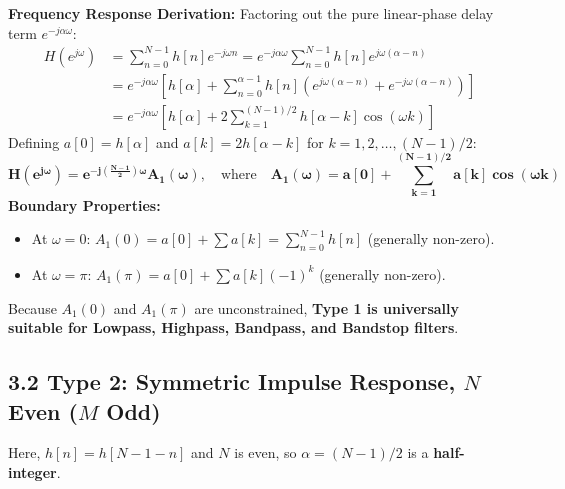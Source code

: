 \documentclass[11pt,a4paper]{article}
\begin{document}
\noindent\textbf{Frequency Response Derivation:}
Factoring out the pure linear-phase delay term $e^{-j\alpha \omega}$:
\begin{align}
H(e^{j\omega}) &= \sum_{n=0}^{N-1} h[n] e^{-j\omega n} = e^{-j\alpha \omega} \sum_{n=0}^{N-1} h[n] e^{j\omega(\alpha - n)} \nonumber \\
&= e^{-j\alpha \omega} \left[ h[\alpha] + \sum_{n=0}^{\alpha-1} h[n] \left( e^{j\omega(\alpha - n)} + e^{-j\omega(\alpha - n)} \right) \right] \nonumber \\
&= e^{-j\alpha \omega} \left[ h[\alpha] + 2 \sum_{k=1}^{(N-1)/2} h[\alpha - k] \cos(\omega k) \right]
\end{align}
Defining $a[0] = h[\alpha]$ and $a[k] = 2h[\alpha - k]$ for $k = 1, 2, \dots, (N-1)/2$:
\begin{equation}
\mathbf{H(e^{j\omega}) = e^{-j\left(\frac{N-1}{2}\right)\omega} A_1(\omega)}, \quad \text{where} \quad \mathbf{A_1(\omega) = a[0] + \sum_{k=1}^{(N-1)/2} a[k] \cos(\omega k)}
\label{eq:type1_A}
\end{equation}
\textbf{Boundary Properties:}
\begin{itemize}
    \item At $\omega = 0$: $A_1(0) = a[0] + \sum a[k] = \sum_{n=0}^{N-1} h[n]$ (generally non-zero).
    \item At $\omega = \pi$: $A_1(\pi) = a[0] + \sum a[k](-1)^k$ (generally non-zero).
\end{itemize}
Because $A_1(0)$ and $A_1(\pi)$ are unconstrained, \textbf{Type 1 is universally suitable for Lowpass, Highpass, Bandpass, and Bandstop filters}.

\subsection{3.2 Type 2: Symmetric Impulse Response, $N$ Even ($M$ Odd)}
Here, $h[n] = h[N-1-n]$ and $N$ is even, so $\alpha = (N-1)/2$ is a \textbf{half-integer}.
\end{document}

